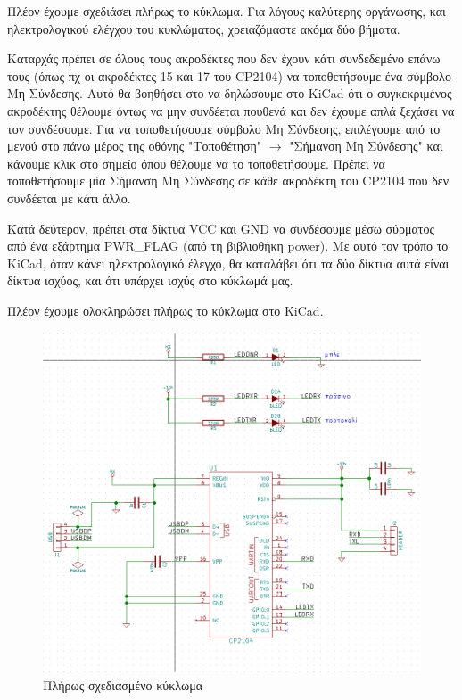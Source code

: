 \documentclass[a4paper]{article}
\begin{document}
Πλέον έχουμε σχεδιάσει πλήρως το κύκλωμα. Για λόγους καλύτερης οργάνωσης, και ηλεκτρολογικού ελέγχου του κυκλώματος, χρειαζόμαστε ακόμα δύο βήματα.

Καταρχάς πρέπει σε όλους τους ακροδέκτες που δεν έχουν κάτι συνδεδεμένο επάνω τους (όπως πχ οι ακροδέκτες 15 και 17 του \textenglish{CP2104}) να τοποθετήσουμε ένα σύμβολο Μη Σύνδεσης. Αυτό θα βοηθήσει στο να δηλώσουμε στο \textenglish{KiCad} ότι ο συγκεκριμένος ακροδέκτης θέλουμε όντως να μην συνδέεται πουθενά και δεν έχουμε απλά ξεχάσει να τον συνδέσουμε. Για να τοποθετήσουμε σύμβολο Μη Σύνδεσης, επιλέγουμε από το μενού στο πάνω μέρος της οθόνης "Τοποθέτηση" $\rightarrow$ "Σήμανση Μη Σύνδεσης" και κάνουμε κλικ στο σημείο όπου θέλουμε να το τοποθετήσουμε. Πρέπει να τοποθετήσουμε μία Σήμανση Μη Σύνδεσης σε κάθε ακροδέκτη του \textenglish{CP2104} που δεν συνδέεται με κάτι άλλο.

Κατά δεύτερον, πρέπει στα δίκτυα VCC και GND να συνδέσουμε μέσω σύρματος από ένα εξάρτημα PWR\_FLAG (από τη βιβλιοθήκη power). Με αυτό τον τρόπο το \textenglish{KiCad}, όταν κάνει ηλεκτρολογικό έλεγχο, θα καταλάβει ότι τα δύο δίκτυα αυτά είναι δίκτυα ισχύος, και ότι υπάρχει ισχύς στο κύκλωμά μας.

Πλέον έχουμε ολοκληρώσει πλήρως το κύκλωμα στο \textenglish{KiCad}.

\begin{figure}
  \begin{center}
    \includegraphics{img/final-schem.png}
    \caption{Πλήρως σχεδιασμένο κύκλωμα}
    \label{fig:final-schem}
  \end{center}
\end{figure}
\end{document}
